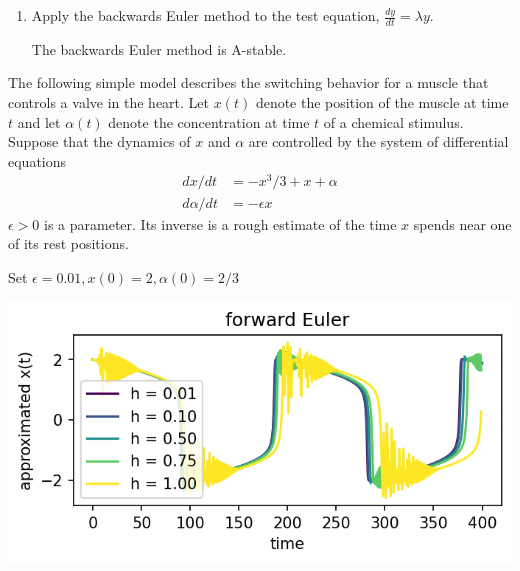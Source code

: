 \documentclass[12pt,letterpaper,noanswers]{exam}
\begin{document}
\begin{enumerate}[resume]
    \item Apply the backwards Euler method to the test equation, $\frac{dy}{dt} = \lambda y$.
    The backwards Euler method is A-stable.
\end{enumerate}


The following simple model describes the switching behavior for a muscle that controls a valve in the heart.  Let $x(t)$ denote the position of the muscle at time $t$ and let $\alpha(t)$ denote the concentration at time $t$ of a chemical stimulus.  Suppose that the dynamics of $x$ and $\alpha$ are controlled by the system of differential equations \begin{align*} dx/dt &= -x^3/3 + x + \alpha \\ d\alpha/dt &= -\epsilon x \end{align*}
$\epsilon > 0$ is a parameter.  Its inverse is a rough estimate of the time $x$ spends near one of its rest positions.

 Set $\epsilon = 0.01, x(0) = 2, \alpha(0) = 2/3$

\includegraphics{AM111-F23-CourseNotes/img/C22-fwd.png}
\end{document}

